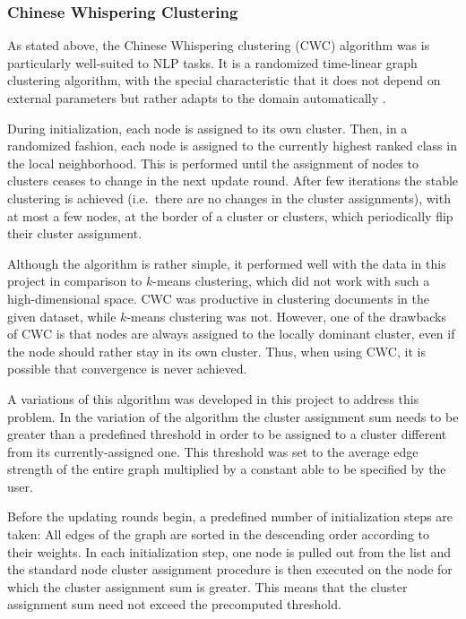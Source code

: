 \subsubsection{Chinese Whispering Clustering}
\label{sec:chinese_whispering_clustering}
As stated above, the Chinese Whispering clustering (CWC) algorithm was is particularly well-suited to NLP tasks. It is a
randomized time-linear graph clustering algorithm, with the special characteristic that it does not depend
on external parameters but rather adapts to the domain automatically \cite{cw_clustering}.

During initialization, each node is assigned to its own cluster. Then, in a randomized
fashion, each node is assigned to the currently highest ranked class in the local neighborhood. This is performed until the assignment of nodes to clusters ceases to change in the next update round. After few iterations the stable clustering is achieved (i.e.\ there are no changes in the cluster
assignments), with at most a few nodes, at the border of a cluster or clusters, which periodically flip their
cluster assignment.

Although the algorithm is rather simple, it performed well with the data in this project in comparison to $k$-means clustering, which did not work with such a high-dimensional space. CWC was productive in clustering documents in the given dataset, while $k$-means clustering was not. However, one of the drawbacks of CWC is that nodes are always assigned to the locally dominant cluster, even if the node should rather stay in its own cluster. Thus, when using CWC, it is possible that convergence is never achieved.

A variations of this algorithm was developed in this project to address this problem.
In the variation of the algorithm the cluster assignment sum needs to be greater than a predefined threshold in order to be assigned to a cluster different from its currently-assigned one. This threshold was set to the average edge strength of the entire graph multiplied by a constant able to be specified by the user.

Before the updating rounds begin, a predefined number of initialization steps are taken: All edges of the graph are sorted in the descending order according to
their weights. In each initialization step, one node is pulled out from the list and the standard
node cluster assignment procedure is then executed on the node for which the cluster assignment sum
is greater. This means that the cluster assignment sum need not exceed the precomputed threshold.

